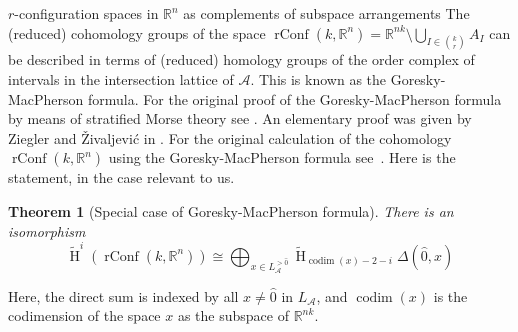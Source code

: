 \documentclass[12pt]{amsart}
\newcommand{\R}{{\mathbb R}}
\newcommand{\Ho}{\operatorname{H}}
\newcommand{\rConf}{\operatorname{rConf}}
\newcommand{\codim}{\operatorname{codim}}
\newcommand{\calA}{{\mathcal{A}}}
\theoremstyle{plain}
\newtheorem{thm}{Theorem}[section]
\theoremstyle{definition}
\theoremstyle{remark}
\begin{document}
\begin{section}{$r$-configuration spaces in $\mathbb R^n$ as complements of subspace arrangements}
The (reduced) cohomology groups of the space $\rConf(k, \R^n)=\R^{nk}\setminus \bigcup_{I\in {k\choose r}} A_I$ can be described in terms of (reduced) homology groups of the order complex of intervals in the intersection lattice of $\calA$. This is known as the Goresky-MacPherson formula. For the original proof of the Goresky-MacPherson formula by means of stratified Morse theory see \cite[Part III]{Goresky1988}. An elementary proof was given by Ziegler and \v Zivaljevi\'c in \cite{ZZ1993}. For the original calculation of the cohomology $\rConf(k, \R^n)$ using the Goresky-MacPherson formula see~\cite{Bjo95}. Here is the statement, in the case relevant to us.
\begin{thm}[Special case of Goresky-MacPherson formula]\label{T:GMFormula}
There is an isomorphism
\begin{equation}\label{E:GMFormula}
\widetilde{\Ho}^{i}(\rConf(k, \R^n)) \cong \bigoplus_{x\in{L^{>\hat{0}}_{\calA}}} \widetilde{\Ho}_{\codim(x)-2-i}\Delta(\hat{0},x)
\end{equation}
\end{thm}
Here, the direct sum is indexed by all $x\neq \hat{0}$ in $L_{\calA}$, and $\codim(x)$ is the codimension of the space $x$ as the subspace of $\R^{nk}$.





\end{section}
\end{document}
